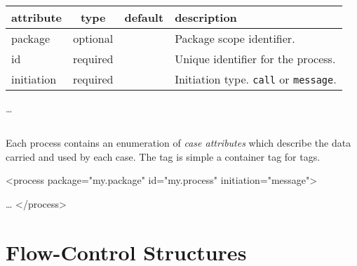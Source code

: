 \begin{tabular}{l|c|c|l}
\textbf{attribute}   &	\textbf{type}		&	\textbf{default}	& \textbf{description} \\
\hline
package		&	optional	&			& Package scope identifier. \\
id			&	required	&			& Unique identifier for the process. \\
initiation	&	required	&			& Initiation type. \verb|call| or \verb|message|.
\end{tabular}

\begin{codelisting}
    \dots
{}
\end{codelisting}

\subsection{}

Each process contains an enumeration of \emph{case attributes} which
describe the data carried and used by each case.  The 
tag is simple a container tag for  tags.

\begin{codelisting}
<process package="my.package"
         id="my.process"
         initiation="message">

         \dots
</process>
\end{codelisting}

\subsection{}


\section{Flow-Control Structures}

\subsection{}

\subsection{}

